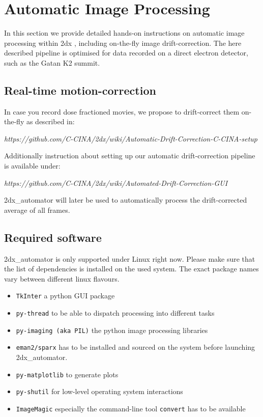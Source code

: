 \section{Automatic Image Processing}

In this section we provide detailed hands-on instructions on automatic image processing within 2dx \cite{scherer20142dx_automator}, including on-the-fly image drift-correction. The here described pipeline is optimised for data recorded on a direct electron detector, such as the Gatan K2 summit. 

\subsection{Real-time motion-correction}

In case you record dose fractioned movies, we propose to drift-correct them on-the-fly as described in:

\textit{https://github.com/C-CINA/2dx/wiki/Automatic-Drift-Correction-C-CINA-setup}

Additionally instruction about setting up our automatic drift-correction pipeline is available under:

\textit{https://github.com/C-CINA/2dx/wiki/Automated-Drift-Correction-GUI}

2dx\_automator will later be used to automatically process the drift-corrected average of all frames.

\subsection{Required software}

2dx\_automator is only supported under Linux right now.
Please make sure that the list of dependencies is installed on the used system. The exact package names vary between different linux flavours. 

\begin{itemize}
	\item \texttt{TkInter} a python GUI package
	\item \texttt{py-thread} to be able to dispatch processing into different tasks
	\item \texttt{py-imaging (aka PIL)} the python image processing libraries
	\item \texttt{eman2/sparx} has to be installed and sourced on the system before launching 2dx\_automator.
	\item \texttt{py-matplotlib} to generate plots
	\item \texttt{py-shutil} for low-level operating system interactions
	\item \texttt{ImageMagic} especially the command-line tool \texttt{convert} has to be available
\end{itemize}


